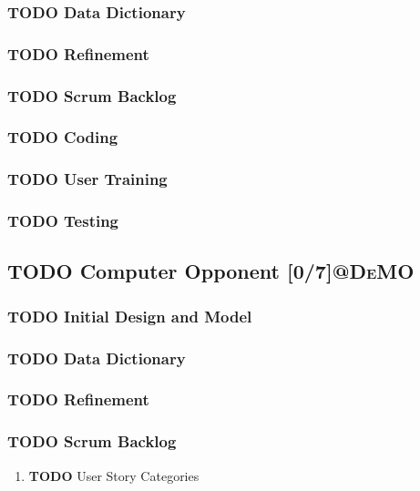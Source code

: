 \documentclass[11pt]{article}
\begin{document}
\subsubsection{{\bfseries\sffamily TODO} Data Dictionary}
\label{sec:orgb1384c9}
\subsubsection{{\bfseries\sffamily TODO} Refinement}
\label{sec:org663730d}
\subsubsection{{\bfseries\sffamily TODO} Scrum Backlog}
\label{sec:orgeb6a832}
\subsubsection{{\bfseries\sffamily TODO} Coding}
\label{sec:org74fc8c2}
\subsubsection{{\bfseries\sffamily TODO} User Training}
\label{sec:orgb966642}
\subsubsection{{\bfseries\sffamily TODO} Testing}
\label{sec:org326e5ec}
\subsection{{\bfseries\sffamily TODO} Computer Opponent  [0/7]\hfill{}\textsc{@DeMO}}
\label{sec:org989699b}
\subsubsection{{\bfseries\sffamily TODO} Initial Design and Model}
\label{sec:org805608e}
\subsubsection{{\bfseries\sffamily TODO} Data Dictionary}
\label{sec:orgb9d9e1e}
\subsubsection{{\bfseries\sffamily TODO} Refinement}
\label{sec:orgf639f6d}
\subsubsection{{\bfseries\sffamily TODO} Scrum Backlog}
\label{sec:orgce14b33}
\begin{enumerate}
\item {\bfseries\sffamily TODO} User Story Categories
\label{sec:org3cb20f3}
\end{enumerate}
\end{document}
